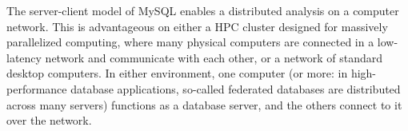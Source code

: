 The server-client model of MySQL enables a distributed analysis on a computer
network. This is advantageous on either a HPC cluster designed for massively
parallelized computing, where many physical computers are connected in a
low-latency network and communicate with each other, or a network of standard
desktop computers. In either environment, one computer (or more: in
high-performance database applications, so-called federated databases are
distributed across many servers) functions as a database server, and the others
connect to it over the network. 


